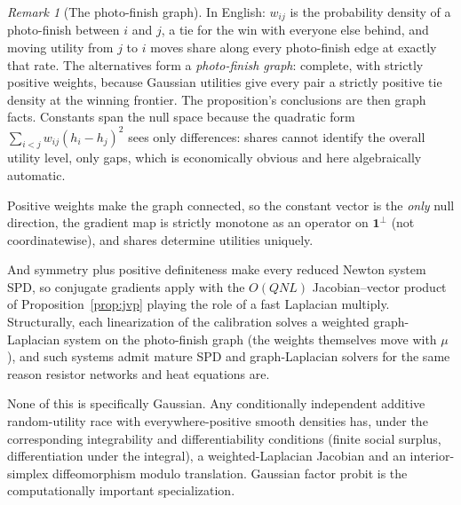 \documentclass[12pt]{article}
\theoremstyle{remark}
\newtheorem{remark}{Remark}
\begin{document}
\begin{remark}[The photo-finish graph]
In English: $w_{ij}$ is the probability density of a photo-finish between
$i$ and $j$, a tie for the win with everyone else behind, and moving
utility from $j$ to $i$ moves share along every photo-finish edge at
exactly that rate. The alternatives form a \emph{photo-finish graph}:
complete, with strictly positive weights, because Gaussian utilities give
every pair a strictly positive tie density at the winning frontier. The proposition's conclusions are then
graph facts. Constants span the null space because the quadratic form
$\sum_{i<j} w_{ij}(h_i - h_j)^2$ sees only differences: shares cannot
identify the overall utility level, only gaps, which is economically
obvious and here algebraically automatic.

Positive weights make the graph
connected, so the constant vector is the \emph{only} null direction, the
gradient map is strictly monotone as an operator on $\mathbf{1}^\perp$
(not coordinatewise), and shares determine utilities uniquely.

And symmetry plus positive definiteness make every
reduced Newton system SPD, so conjugate gradients apply with the $O(QNL)$
Jacobian--vector product of Proposition~\ref{prop:jvp} playing the role of
a fast Laplacian multiply. Structurally, each linearization of the calibration solves a weighted
graph-Laplacian system on the photo-finish graph (the weights themselves
move with $\mu$), and such systems admit mature SPD and
graph-Laplacian solvers for the same reason resistor
networks and heat equations are.

None of this is specifically Gaussian.
Any conditionally independent additive random-utility race with
everywhere-positive smooth densities has, under the corresponding
integrability and differentiability conditions (finite social surplus,
differentiation under the integral), a weighted-Laplacian Jacobian and an
interior-simplex diffeomorphism modulo translation. Gaussian factor
probit is the computationally important specialization.
\end{remark}
\end{document}
